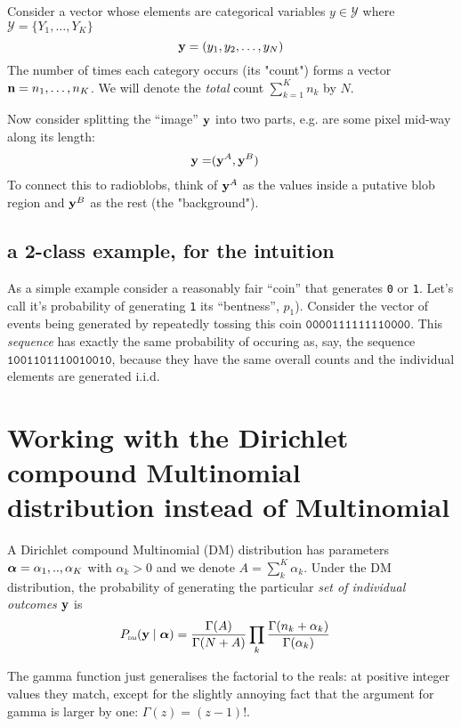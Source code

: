 \documentclass[12pt]{article}
\begin{document}
Consider a vector whose elements are categorical variables $y \in \mathcal{Y} $ where $\mathcal{Y} = \{Y_1,\ldots,Y_K \}$
\[
\mathbf{y} = (y_1,y_2, \ldots, y_N) \]
The number of times each category occurs (its "count") forms a vector
$ \mathbf{n} = n_1,\ldots,n_K  $. We will denote the {\it total} count $\sum_{k=1}^K n_k$ by $N$.

Now consider splitting the ``image'' $\mathbf{y}$ into two parts, e.g. are some pixel mid-way along its length:
\begin{align*}
\mathbf{y} =& (\mathbf{y}^A, \mathbf{y}^B)
\end{align*}
To connect this to radioblobs, think of $\mathbf{y}^A$ as the values inside a putative blob region and $\mathbf{y}^B$ as the rest (the "background").

\subsection{a 2-class example, for the intuition}

As a simple example consider a reasonably fair ``coin'' that
generates \texttt{0} or \texttt{1}. Let's call it's probability of
generating \texttt{1} its ``bentness'', $p_1$).  Consider the vector
of events being generated by repeatedly tossing this coin
$\mathtt{0000111111110000}$.  This {\it sequence} has exactly the same
probability of occuring as, say, the sequence
$\mathtt{1001101110010010}$, because they have the same overall counts
and the individual elements are generated i.i.d.

\section{Working with the Dirichlet compound Multinomial distribution instead of Multinomial}
A Dirichlet compound Multinomial (DM) distribution has parameters
$\boldsymbol\alpha = \alpha_1,..,\alpha_K$ with $\alpha_k > 0$ and we denote $ A
= \sum_k^K \alpha_k$. Under the DM distribution, the probability of
generating the particular {\it set of individual outcomes}
$\mathbf{y}$ is
\begin{align}
P_\text{\tiny\sc dm}(\mathbf{y} \mid\boldsymbol\alpha) &= \frac{\Gamma(A)}{\Gamma(N+A)} \prod_k \frac{\Gamma(n_k+\alpha_k)}{\Gamma(\alpha_k)}  \label{eq:DMvalues}
\end{align}

The gamma function just generalises the factorial to the reals: at
positive integer values they match, except for the slightly annoying
fact that the argument for gamma is larger by one: $\Gamma(z) =
(z-1)!$.
\end{document}
